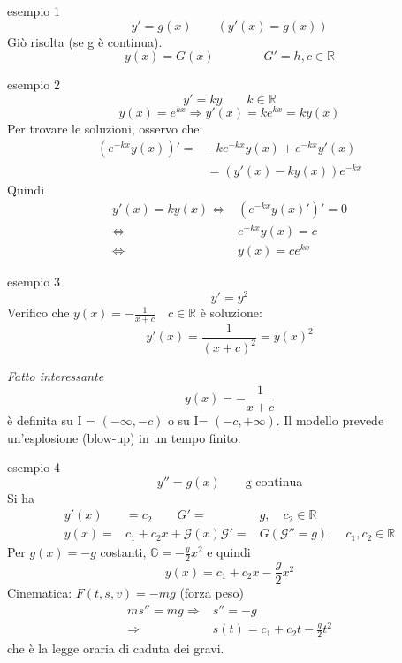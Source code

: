 \documentclass[x11names]{article}
\begin{document}
	\begin{es}{esempio 1}
		\[
		y' = g(x) \qquad \left(y'(x) = g(x)\right)
		\]
		Giò risolta (se g è continua).
		\[
		y(x) = G(x) \qquad \qquad G' = h, c \in \mathbb{R}
		\]
	\end{es}
	
	\begin{es}{esempio 2}
		\[
		y' = ky \qquad k \in \mathbb{R}
		\]
		\[
		y(x) = e^{kx} \Longrightarrow y'(x) = ke^{kx} = ky(x)
		\]
		Per trovare le soluzioni, osservo che:
		\begin{align*}
			\left(e^{-kx}y(x)\right)' =& - ke^{-kx}y(x) + e^{-kx}y'(x) \\
			&= \left(y'(x) - ky(x)\right)e^{-kx}
		\end{align*}
		Quindi
		\begin{align*}
			y'(x) = ky(x) \Longleftrightarrow & \left(e^{-kx}y(x)'\right)' = 0 \\
			\Longleftrightarrow & e^{-kx}y(x) = c \\
			\Longleftrightarrow & y(x) = ce^{kx}
		\end{align*}
	\end{es}
	
	\begin{es}{esempio 3}
		\[
		y' = y^2
		\]
		Verifico che $y(x) = - \frac{1}{x+c} \quad c \in \mathbb{R}$ è soluzione:
		\[
		y'(x) = \frac{1}{(x+c)^2} = y(x)^2
		\]
	
		\textit{Fatto interessante}
		\[
		y(x) = - \frac{1}{x+c}
		\]
		è definita su I = $(-\infty, -c)$ o su I= $(-c, + \infty)$.	Il modello prevede un'esplosione (blow-up) in un tempo finito.
	\end{es}
	\begin{es}{esempio 4}
		\[
		y'' = g(x) \qquad \text{g continua}
		\]
		Si ha
		\begin{align*}
			y'(x) &= c_2 \qquad G'=& g, \quad c_2 \in \mathbb{R} \\
			y(x) =& c_1 + c_2x + \mathcal{G}(x) \mathcal{G}' =& G (\mathcal{G}'' = g), \quad c_1, c_2 \in \mathbb{R}
		\end{align*}
		Per $g(x) = -g$ costanti, $\mathbb{G} = - \frac{g}{2}x^2$ e quindi
		\[
		y(x) = c_1 + c_2x - \frac{g}{2}x^2
		\]
		Cinematica: $F(t,s,v) = -mg$ (forza peso)
		\begin{align*}
			ms'' = mg \Longrightarrow & s'' = -g \\
			\Longrightarrow & s(t) = c_1 + c_2t - \frac{g}{2}t^2
		\end{align*}
		che è la legge oraria di caduta dei gravi.
	\end{es}
	
\end{document}
